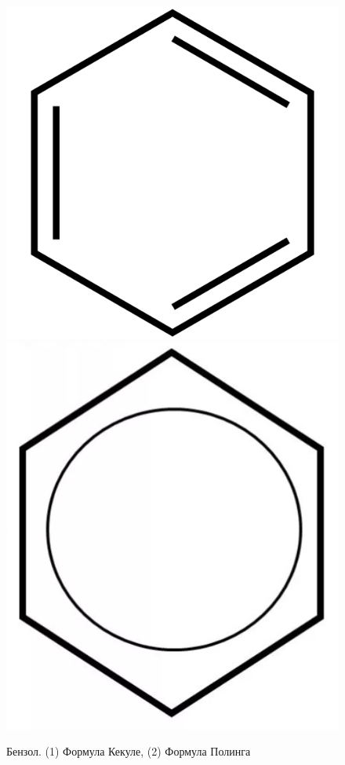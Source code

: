 \begin{enumerate}[1.]
    \begin{figure}[h!] 
    	\center
    	\includegraphics [scale=0.16] {my_folder/images/benzol_kekule}
    	\includegraphics [scale=0.28] {my_folder/images/benzol_poling}
    	\caption{Бензол. (1) Формула Кекуле, (2) Формула Полинга} 
    	\label{fig:benzol}
    \end{figure}
\end{enumerate}

